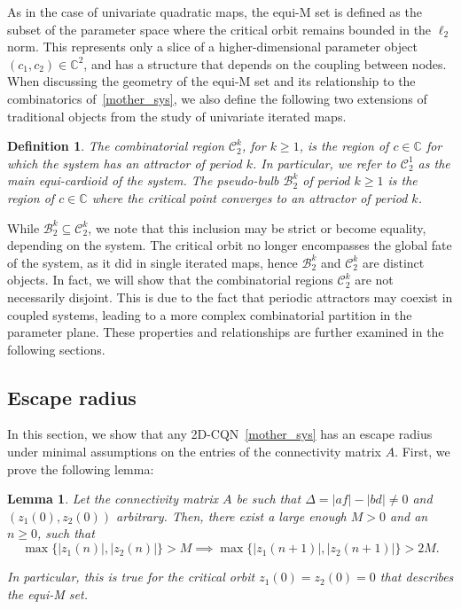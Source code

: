 \documentclass[10pt]{article}
\newtheorem{lemma}[thm]{Lemma}
\newtheorem{defn}[thm]{Definition}
\begin{document}
As in the case of univariate quadratic maps, the equi-M set is defined as the subset of the parameter space where the critical orbit remains bounded in the $\ell_2$ norm. This represents only a slice of a higher-dimensional parameter object $(c_1,c_2)\in \mathbb{C}^2$, and has a structure that depends on the coupling between nodes. When discussing the geometry of the equi-M set and its relationship to the combinatorics of~\eqref{mother_sys}, we also define the following two extensions of traditional objects from the study of univariate iterated maps.

\begin{defn} \label{eq:pseudo_bulb}
The combinatorial region $\mathcal{C}_2^k$, for $k \geq 1$, is the region of $c\in \mathbb{C}$ for which the system has an attractor of period $k$. In particular, we refer to $\mathcal{C}_2^1$ as the main equi-cardioid of the system. The pseudo-bulb $\mathcal{B}_2^k$ of period $k \geq 1$ is the region of $c \in \mathbb{C}$ where the critical point converges to an attractor of period $k$.
\end{defn}

While $\mathcal{B}_2^k \subseteq \mathcal{C}_2^k$, we note that this inclusion may be strict or become equality, depending on the system. The critical orbit no longer encompasses the global fate of the system, as it did in single iterated maps, hence $\mathcal{B}_2^k$ and $\mathcal{C}_2^k$ are distinct objects. In fact, we will show that the combinatorial regions $\mathcal{C}_2^k$ are not necessarily disjoint. This is due to the fact that periodic attractors may coexist in coupled systems, leading to a more complex combinatorial partition in the parameter plane. These properties and relationships are further examined in the following sections.

\subsection{Escape radius}
\label{escape_rad}

In this section, we show that any 2D-CQN~\eqref{mother_sys} has an escape radius under minimal assumptions on the entries of the connectivity matrix $A$. First, we prove the following lemma:


\begin{lemma} \label{case1}
Let the connectivity matrix $A$ be such that $\Delta = |a f| - |bd| \neq 0$ and $(z_1(0), z_2(0))$ arbitrary. Then, there exist a large enough $M > 0$ and an $n \ge 0$, such that
\[
\max\{|z_1(n)|, |z_2(n)|\} > M \implies \max\{|z_1(n + 1)|, |z_2(n + 1)|\} > 2 M.
\]

In particular, this is true for the critical orbit $z_1(0) = z_2(0) = 0$ that describes the
equi-M set.
\end{lemma}
\end{document}
